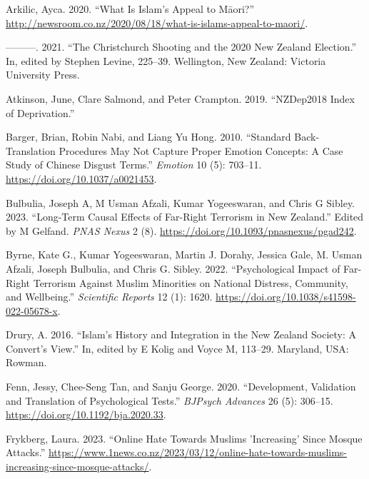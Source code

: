 \documentclass[
]{interact}
\newlength{\cslhangindent}
\newenvironment{CSLReferences}[2] %
 {\begin{list}{}{%
  \setlength{\itemindent}{0pt}
  \setlength{\leftmargin}{0pt}
  \setlength{\parsep}{0pt}
  \ifodd #1
   \setlength{\leftmargin}{\cslhangindent}
   \setlength{\itemindent}{-1\cslhangindent}
  \fi
  \setlength{\itemsep}{#2\baselineskip}}}
 {\end{list}}
\begin{document}
\label{refs}
\begin{CSLReferences}{1}{0}
Arkilic, Ayca. 2020. {``What Is {I}slam's Appeal to {M}{ā}ori?''}
\url{http://newsroom.co.nz/2020/08/18/what-is-islams-appeal-to-maori/}.

---------. 2021. {``The {C}hristchurch Shooting and the 2020 {N}ew
{Z}ealand Election.''} In, edited by Stephen Levine, 225--39.
Wellington, New Zealand: Victoria University Press.

Atkinson, June, Clare Salmond, and Peter Crampton. 2019. {``NZDep2018
Index of Deprivation.''}

Barger, Brian, Robin Nabi, and Liang Yu Hong. 2010. {``Standard
Back-Translation Procedures May Not Capture Proper Emotion Concepts: A
Case Study of Chinese Disgust Terms.''} \emph{Emotion} 10 (5): 703--11.
\url{https://doi.org/10.1037/a0021453}.

Bulbulia, Joseph A, M Usman Afzali, Kumar Yogeeswaran, and Chris G
Sibley. 2023. {``Long-Term Causal Effects of Far-Right Terrorism in New
Zealand.''} Edited by M Gelfand. \emph{PNAS Nexus} 2 (8).
\url{https://doi.org/10.1093/pnasnexus/pgad242}.

Byrne, Kate G., Kumar Yogeeswaran, Martin J. Dorahy, Jessica Gale, M.
Usman Afzali, Joseph Bulbulia, and Chris G. Sibley. 2022.
{``Psychological Impact of Far-Right Terrorism Against Muslim Minorities
on National Distress, Community, and Wellbeing.''} \emph{Scientific
Reports} 12 (1): 1620. \url{https://doi.org/10.1038/s41598-022-05678-x}.

Drury, A. 2016. {``{Islam{'}s} History and Integration in the {N}ew
{Z}ealand Society: A {Convert{'}s} View.''} In, edited by E Kolig and
Voyce M, 113--29. Maryland, USA: Rowman.

Fenn, Jessy, Chee-Seng Tan, and Sanju George. 2020. {``Development,
Validation and Translation of Psychological Tests.''} \emph{BJPsych
Advances} 26 (5): 306--15. \url{https://doi.org/10.1192/bja.2020.33}.

Frykberg, Laura. 2023. {``Online Hate Towards Muslims 'Increasing' Since
Mosque Attacks.''}
\url{https://www.1news.co.nz/2023/03/12/online-hate-towards-muslims-increasing-since-mosque-attacks/}.


\end{CSLReferences}
\end{document}

